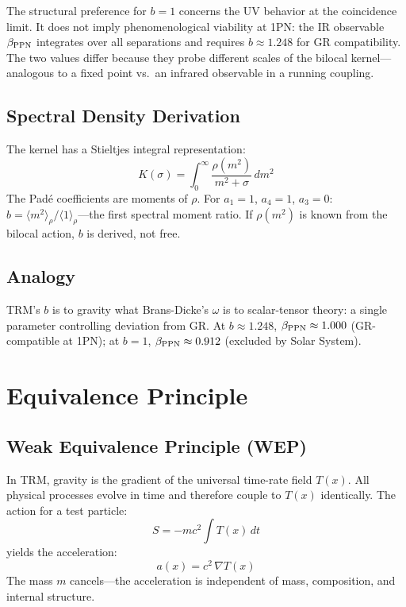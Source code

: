 \documentclass[12pt]{article}
\begin{document}
The structural preference for $b=1$ concerns the UV behavior at the coincidence limit. It does not imply phenomenological viability at 1PN: the IR observable $\beta_{\rm PPN}$ integrates over all separations and requires $b\approx 1.248$ for GR compatibility. The two values differ because they probe different scales of the bilocal kernel---analogous to a fixed point vs.\ an infrared observable in a running coupling.

\subsection{Spectral Density Derivation}

The kernel has a Stieltjes integral representation:
\begin{equation}
K(\sigma) = \int_0^\infty \frac{\rho(m^2)}{m^2 + \sigma}\,dm^2
\end{equation}
The Pad\'e coefficients are moments of $\rho$. For $a_1=1$, $a_4=1$, $a_3=0$: $b = \langle m^2\rangle_\rho / \langle 1\rangle_\rho$---the first spectral moment ratio. If $\rho(m^2)$ is known from the bilocal action, $b$ is derived, not free.

\subsection{Analogy}

TRM's $b$ is to gravity what Brans-Dicke's $\omega$ is to scalar-tensor theory: a single parameter controlling deviation from GR. At $b\approx 1.248$, $\beta_{\rm PPN}\approx 1.000$ (GR-compatible at 1PN); at $b=1$, $\beta_{\rm PPN}\approx 0.912$ (excluded by Solar System).

\section{Equivalence Principle}
\label{sec:EP}

\subsection{Weak Equivalence Principle (WEP)}

In TRM, gravity is the gradient of the universal time-rate field $T(x)$. All physical processes evolve in time and therefore couple to $T(x)$ identically. The action for a test particle:
\begin{equation}
S = -mc^2 \int T(x)\,dt
\end{equation}
yields the acceleration:
\begin{equation}
a(x) = c^2\,\nabla T(x)
\end{equation}
The mass $m$ cancels---the acceleration is independent of mass, composition, and internal structure.
\end{document}

